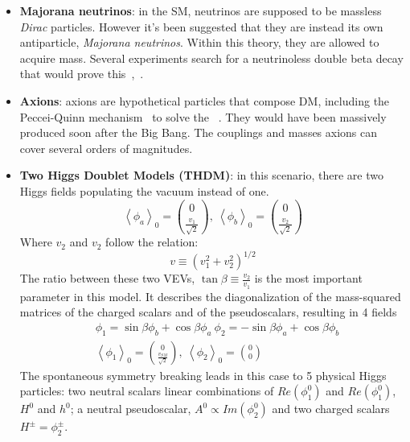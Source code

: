 \begin{itemize}
\item \textbf{Majorana neutrinos}: in the SM, neutrinos are supposed to be massless \textit{Dirac} particles. However it's been suggested that they are instead its own antiparticle, \textit{Majorana neutrinos}. Within this theory, they are allowed to acquire mass. Several experiments search for a neutrinoless double beta decay that would prove this~\cite{KamLAND-Zen:2016pfg},~\cite{GERDA}.
\item \textbf{Axions}: axions are hypothetical particles that compose DM, including the Peccei-Quinn mechanism~\cite{Axions1} to solve the ~\cite{StrongCP}. They would have been massively produced soon after the Big Bang. The couplings and masses axions can cover several orders of magnitudes. %
\item \textbf{Two Higgs Doublet Models (THDM)}: in this scenario, there are two Higgs fields populating the vacuum instead of one. %
\begin{equation}
\left \langle \phi_a \right \rangle_0 = \binom{0}{\frac{v_1}{\sqrt{2}}}, \ \left \langle \phi_b \right \rangle_0 = \binom{0}{\frac{v_2}{\sqrt{2}}}
\end{equation}
Where $v_2$ and $v_2$ follow the relation:
\begin{equation}
v \equiv (v_1^2 + v_2^2)^{1/2}
\end{equation}
The ratio between these two VEVs, $\tan{\beta} \equiv \frac{v_2}{v_1}$ is the most important parameter in this model. It describes the diagonalization of the mass-squared matrices of the charged scalars and of the pseudoscalars, resulting in 4 fields
\begin{equation}
\begin{split}
& \phi_1 = \sin{\beta}\phi_b + \cos{\beta}\phi_a \ \phi_2 = -\sin{\beta}\phi_a + \cos{\beta}\phi_b \\
& \left \langle \phi_1 \right \rangle_0 = \binom{0}{\frac{v_{SM}}{\sqrt{2}}}, \ \left \langle \phi_2 \right \rangle_0 = \binom{0}{0}
\end{split}
\end{equation}
The spontaneous symmetry breaking leads in this case to 5 physical Higgs particles: two neutral scalars linear combinations of $Re(\phi_1^0)$ and $Re(\phi_1^0)$, $H^0$ and $h^0$; a neutral pseudoscalar, $A^0 \propto Im(\phi_2^0)$ and two charged scalars $H^\pm = \phi_2^\pm$.  

\end{itemize}

